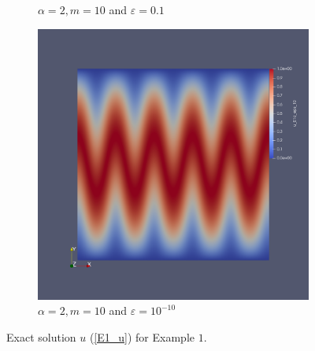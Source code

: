 \documentclass[12pt]{ociamthesis}
\begin{document}
\begin{figure}[H]
\begin{subfigure}{0.44\textwidth}
     \caption{$\alpha=2, m=10$ and $\varepsilon = 0.1$}
 \end{subfigure}
 \hfill
 \begin{subfigure}{0.44\textwidth}
     \includegraphics[width=\textwidth]{Pics/uf/u_E1c_eps_10.png}
     \caption{$\alpha=2, m=10$ and $\varepsilon = 10^{-10}$}
 \end{subfigure}
 \caption{Exact solution $u$ (\ref{E1_u}) for Example $1$.} \label{E1_us}
\end{figure}
\end{document}
